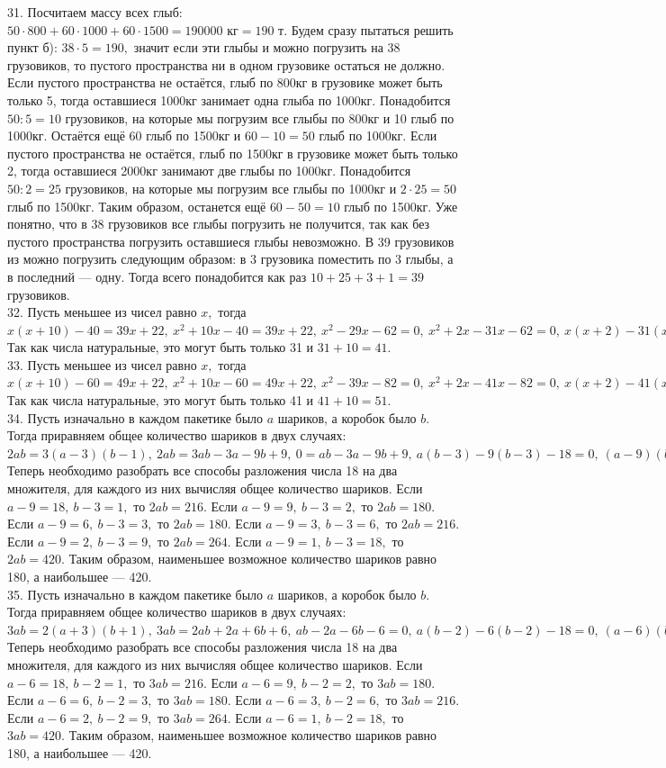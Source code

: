 \documentclass[12pt]{article}
\begin{document}
31. Посчитаем массу всех глыб: $50\cdot800+60\cdot1000+60\cdot1500=190000\text{ кг}=190\text{ т}.$ Будем сразу пытаться решить пункт б): $38\cdot5=190,$ значит если эти глыбы и можно погрузить на 38 грузовиков, то пустого пространства ни в одном грузовике остаться не должно. Если пустого пространства не остаётся, глыб по 800кг в грузовике может быть только 5, тогда оставшиеся 1000кг занимает одна глыба по 1000кг. Понадобится $50:5=10$ грузовиков, на которые мы погрузим все глыбы по 800кг и 10 глыб по 1000кг. Остаётся ещё 60 глыб по 1500кг и $60-10=50$ глыб по 1000кг. Если пустого пространства не остаётся, глыб по 1500кг в грузовике может быть только 2, тогда оставшиеся 2000кг занимают две глыбы по 1000кг. Понадобится $50:2=25$ грузовиков, на которые мы погрузим все глыбы по 1000кг и $2\cdot25=50$ глыб по 1500кг. Таким образом, останется ещё $60-50=10$ глыб по 1500кг. Уже понятно, что в 38 грузовиков все глыбы погрузить не получится, так как без пустого пространства погрузить оставшиеся глыбы невозможно. В 39 грузовиков из можно погрузить следующим образом: в 3 грузовика поместить по 3 глыбы, а в последний --- одну. Тогда всего понадобится как раз $10+25+3+1=39$ грузовиков.\\
32. Пусть меньшее из чисел равно $x,$ тогда $x(x+10)-40=39x+22,\ x^2+10x-40=39x+22,\ x^2-29x-62=0,\ x^2+2x-31x-62=0,\ x(x+2)-31(x+2)=0,\ (x-31)(x+2)=0.$ Так как числа натуральные, это могут быть только 31 и $31+10=41.$\\
33. Пусть меньшее из чисел равно $x,$ тогда $x(x+10)-60=49x+22,\ x^2+10x-60=49x+22,\ x^2-39x-82=0,\ x^2+2x-41x-82=0,\ x(x+2)-41(x+2)=0,\ (x-41)(x+2)=0.$ Так как
числа натуральные, это могут быть только 41 и $41+10=51.$\\
34. Пусть изначально в каждом пакетике было $a$ шариков, а коробок было $b.$ Тогда приравняем общее количество шариков в двух случаях: $2ab=3(a-3)(b-1),\ 2ab=3ab-3a-9b+9,\ 0=ab-3a-9b+9,\ a(b-3)-9(b-3)-18=0,\ (a-9)(b-3)=18.$ Теперь необходимо разобрать все способы разложения числа 18 на два множителя, для каждого из них вычисляя общее количество шариков. Если $a-9=18,\ b-3=1,$ то $2ab=216.$ Если $a-9=9,\ b-3=2,$ то $2ab=180.$ Если $a-9=6,\ b-3=3,$ то $2ab=180.$ Если $a-9=3,\ b-3=6,$ то $2ab=216.$ Если $a-9=2,\ b-3=9,$ то $2ab=264.$ Если $a-9=1,\ b-3=18,$ то $2ab=420.$ Таким образом, наименьшее возможное количество шариков равно 180, а наибольшее --- 420.\\
35. Пусть изначально в каждом пакетике было $a$ шариков, а коробок было $b.$ Тогда приравняем общее количество шариков в двух случаях: $3ab=2(a+3)(b+1),\ 3ab=2ab+2a+6b+6,\ ab-2a-6b-6=0,\ a(b-2)-6(b-2)-18=0,\ (a-6)(b-2)=18.$ Теперь необходимо разобрать все способы разложения числа 18 на два множителя, для каждого из них вычисляя общее количество шариков. Если $a-6=18,\ b-2=1,$ то $3ab=216.$ Если $a-6=9,\ b-2=2,$ то $3ab=180.$ Если $a-6=6,\ b-2=3,$ то $3ab=180.$ Если $a-6=3,\ b-2=6,$ то $3ab=216.$ Если $a-6=2,\ b-2=9,$ то $3ab=264.$ Если $a-6=1,\ b-2=18,$ то $3ab=420.$ Таким образом, наименьшее возможное количество шариков равно 180, а наибольшее --- 420.\\
\end{document}
